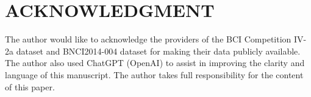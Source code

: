 \documentclass[journal]{IEEEtran}
\begin{document}
\section*{ACKNOWLEDGMENT}
The author would like to acknowledge the providers of the BCI Competition IV-2a dataset and BNCI2014-004 dataset for making their data publicly available. The author also used ChatGPT (OpenAI) to assist in improving the clarity and language of this manuscript. The author takes full responsibility for the content of this paper.



\end{document}
